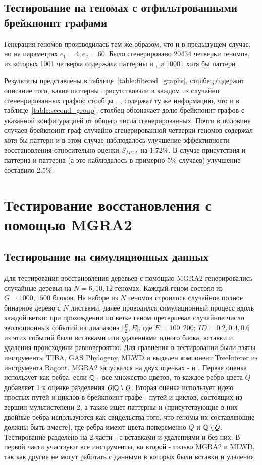 \subsection{Тестирование на геномах с отфильтрованными брейкпоинт графами}
Генерация геномов производилась тем же образом, что и в предыдущем случае, но на параметрах $e_1 = 4, e_2 = 60$.
Было сгенерировано 20434 четверки геномов, из которых 1001 четверка содержала паттерны  и ,
и 10001 хотя бы паттерн .

Результаты представлены в таблице~\ref{table:filtered_graphs}, столбец  содержит описание того, какие паттерны присутствовали в каждом из случайно сгененрированных графов;
столбцы , ,  содержат ту же информацию, что и в таблице~\ref{table:second_group};
столбец  обозначает долю брейкпоинт графов с указанной конфигурацией от общего числа сгенерированных.
Почти в половине случаев брейкпоинт граф случайно сгенерированной четверки геномов содержал
хотя бы паттерн  и в этом случае наблюдалось улучшение эффективности восстановления относительно оценки $S_{MCA}$ на 1.72\%.
В случае присутствия и паттерна  и паттерна  (а это наблюдалось в примерно 5\% случаев) улучшение составило 2.5\%.

\section{Тестирование восстановления с помощью MGRA2}
\subsection{Тестирование на симуляционных данных}
Для тестирования восстановления деревьев с помощью MGRA2 генерировались случайные деревья на $N = 6, 10, 12$ геномах.
Каждый геном состоял из $G = 1000, 1500$ блоков.
На наборе из $N$ геномов строилось случайное полное бинарное дерево с $N$ листьями, далее проводился симуляционный процесс вдоль каждой ветки:
при прохождении по ветке геном претерпевал случайное число эволюционных событий из диапазона $\lbrack \frac{E}{2}, E \rbrack$,
где $E = 100, 200$; $ID = 0.2, 0.4, 0.6$ из этих событий были вставками или удалениями одного блока, вставки и удаления происходили равновероятно.
Для сравнения в тестировании были взяты инструменты TIBA, GAS Phylogeny, MLWD и выделен компонент TreeInferer из инструмента Ragout.
MGRA2 запускался на двух оценках -  и .
Первая оценка использует как  ребра: если $\mathbb{Q}$ - все множество цветов,
то каждое ребро цвета $Q$ добавляет 1 к оценке разделения $Q|\mathbb{Q} \setminus Q$.
Вторая оценка использует идею простых путей и циклов в брейкпоинт графе - путей и циклов, состоящих из вершин мультистепени 2,
а также ищет паттерны  и  (присутствующие в них двойные ребра используются как свидельства того, что геномы
их составляющие должны быть вместе),
где ребра имеют цвета попеременно $Q$ и $\mathbb{Q} \setminus Q$.
Тестирование разделено на 2 части - с вставками и удалениями и без них.
В первой части участвуют все инструменты, во второй - только MGRA2 и MLWD,
так как другие не могут работать с данными в которых были вставки и удаления.

